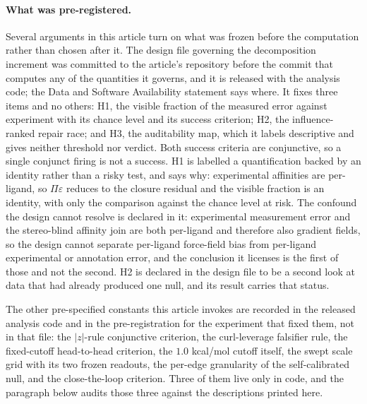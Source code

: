 \paragraph{What was pre-registered.} Several arguments in this article turn on what was frozen
before the computation rather than chosen after it. The design file governing the decomposition
increment was committed to the article's repository before the commit that computes any of the
quantities it governs, and it is released with the analysis code; the Data and Software
Availability statement says where. It fixes three items and no others: H1, the visible fraction of
the measured error against experiment with its chance level and its success criterion; H2, the
influence-ranked repair race; and H3, the auditability map, which it labels descriptive and gives
neither threshold nor verdict. Both
success criteria are conjunctive, so a single conjunct firing is not a success. H1 is labelled a
quantification backed by an identity rather than a risky test, and says why: experimental
affinities are per-ligand, so $\Pi\varepsilon$ reduces to the closure residual and the visible
fraction is an identity, with only the comparison against the chance level at risk. The confound
the design cannot resolve is declared in it: experimental measurement error and the stereo-blind
affinity join are both per-ligand and therefore also gradient fields, so the design cannot separate
per-ligand force-field bias from per-ligand experimental or annotation error, and the conclusion it
licenses is the first of those and not the second. H2 is declared in the design file to be a second
look at data that had already produced one null, and its result carries that status.

The other pre-specified constants this article invokes are recorded in the released analysis code
and in the pre-registration for the experiment that fixed them, not in that file: the $|z|$-rule
conjunctive criterion, the curl-leverage falsifier rule, the fixed-cutoff head-to-head criterion,
the $1.0$ kcal/mol cutoff itself, the swept scale grid with its two frozen readouts, the per-edge
granularity of the self-calibrated null, and the close-the-loop criterion. Three of them live only
in code, and the paragraph below audits those three against the descriptions printed here.

